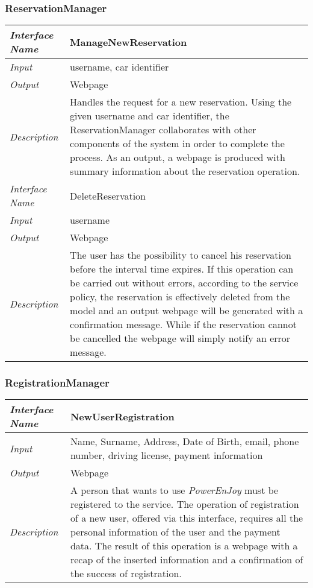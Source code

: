 \documentclass[11pt,a4paper]{report}
\begin{document}
\subsubsection{ReservationManager}
\begin{tabularx}{\textwidth}{|>{\em}l|X|}
	\hline
	Interface Name& ManageNewReservation\\
	\hline
	Input & username, car identifier\\
	\hline
	Output & Webpage\\
	\hline
	Description &Handles the request for a new reservation. Using the given username and car identifier, the ReservationManager collaborates with other components of the system in order to complete the process. As an output, a webpage is produced with summary information about the reservation operation.\\
	\hline \hline
	Interface Name& DeleteReservation\\
	\hline
	Input & username\\
	\hline
	Output & Webpage\\
	\hline
	Description &The user has the possibility to cancel his reservation before the interval time expires. If this operation can be carried out without errors, according to the service policy, the reservation is effectively deleted from the model and an output webpage will be generated with a confirmation message. While if the reservation cannot be cancelled the webpage will simply notify an error message.\\
	\hline
\end{tabularx}

\subsubsection{RegistrationManager}
\begin{tabularx}{\textwidth}{|>{\em}l|X|}
	\hline
	Interface Name& NewUserRegistration\\
	\hline
	Input& Name, Surname, Address, Date of Birth, email, phone number, driving license, payment information\\
	\hline
	Output & Webpage\\
	\hline
	Description &A person that wants to use \textit{PowerEnJoy} must be registered to the service. The operation of registration of a new user, offered via this interface, requires all the personal information of the user and the payment data. The result of this operation is a webpage with a recap of the inserted information and a confirmation of the success of registration.\\
	\hline
\end{tabularx}
\end{document}
